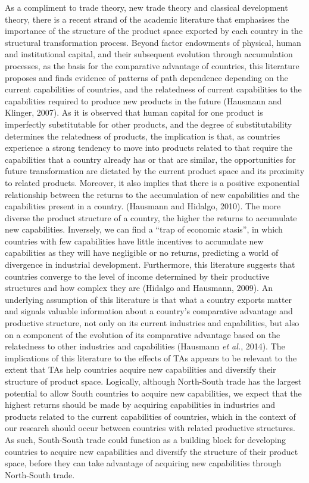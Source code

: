 As a compliment to trade theory, new trade theory and classical
development theory, there is a recent strand of the academic literature
that emphasises the importance of the structure of the product space
exported by each country in the structural transformation process.
Beyond factor endowments of physical, human and institutional capital,
and their subsequent evolution through accumulation processes, as the
basis for the comparative advantage of countries, this literature
proposes and finds evidence of patterns of path dependence depending on
the current capabilities of countries, and the relatedness of current
capabilities to the capabilities required to produce new products in the
future (Hausmann and Klinger, 2007). As it is observed that human
capital for one product is imperfectly substitutable for other products,
and the degree of substitutability determines the relatedness of
products, the implication is that, as countries experience a strong
tendency to move into products related to that require the capabilities
that a country already has or that are similar, the opportunities for
future transformation are dictated by the current product space and its
proximity to related products. Moreover, it also implies that there is a
positive exponential relationship between the returns to the
accumulation of new capabilities and the capabilities present in a
country. (Hausmann and Hidalgo, 2010). The more diverse the product
structure of a country, the higher the returns to accumulate new
capabilities. Inversely, we can find a ``trap of economic stasis'', in
which countries with few capabilities have little incentives to
accumulate new capabilities as they will have negligible or no returns,
predicting a world of divergence in industrial development. Furthermore,
this literature suggests that countries converge to the level of income
determined by their productive structures and how complex they are
(Hidalgo and Hausmann, 2009). An underlying assumption of this
literature is that what a country exports matter and signals valuable
information about a country's comparative advantage and productive
structure, not only on its current industries and capabilities, but also
on a component of the evolution of its comparative advantage based on
the relatedness to other industries and capabilities (Hausmann \emph{et
al.}, 2014). The implications of this literature to the effects of TAs
appears to be relevant to the extent that TAs help countries acquire new
capabilities and diversify their structure of product space. Logically,
although North-South trade has the largest potential to allow South
countries to acquire new capabilities, we expect that the highest
returns should be made by acquiring capabilities in industries and
products related to the current capabilities of countries, which in the
context of our research should occur between countries with related
productive structures. As such, South-South trade could function as a
building block for developing countries to acquire new capabilities and
diversify the structure of their product space, before they can take
advantage of acquiring new capabilities through North-South trade.
